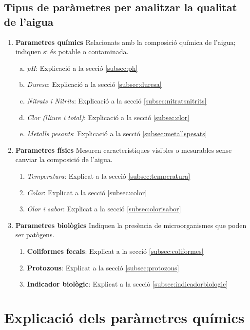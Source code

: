 \subsection{Tipus de paràmetres per analitzar la qualitat de l'aigua}
\begin{enumerate}[1)]
 \item \textbf{Parametres químics}
 Relacionats amb la composició química de l’aigua; indiquen si és potable o contaminada.
 \begin{enumerate}[a)]
  \item \textit{pH}: Explicació a la secció \ref{subsec:ph}
  \item \textit{Duresa}: Explicació a la secció  \ref{subsec:duresa}
  \item \textit{Nitrats i Nitrits}: Explicació a la secció  \ref{subsec:nitratsnitrits}
  \item \textit{Clor (lliure i total)}: Explicació a la secció  \ref{subsec:clor}
  \item \textit{Metalls pesants}: Explicació a la secció   \ref{subsec:metallspesats}
 \end{enumerate}
 \item \textbf{Parametres físics}
 Mesuren característiques visibles o mesurables sense canviar la composició de l’aigua.
 \begin{enumerate}
  \item \textit{Temperatura}: Explicat a la secció \ref{subsec:temperatura}
  \item \textit{Color}: Explicat a la secció \ref{subsec:color}
  \item \textit{Olor i sabor}: Explicat a la secció \ref{subsec:olorisabor}
 \end{enumerate}
 \item \textbf{Parametres biològics}
 Indiquen la presència de microorganismes que poden ser patògens.
 \begin{enumerate}
  \item \textbf{Coliformes fecals}: Explicat a la secció \ref{subsec:coliformes}
  \item \textbf{Protozous}: Explicat a la secció \ref{subsec:protozous}
  \item \textbf{Indicador biològic}: Explicat a la secció \ref{subsec:indicadorbiologic}

 \end{enumerate}

\end{enumerate}

\section{Explicació dels paràmetres químics}

